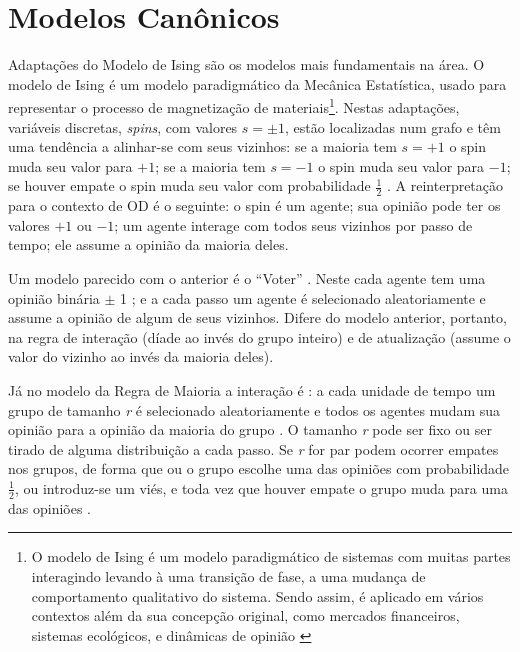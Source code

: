  

  \section{Modelos Canônicos}

  Adaptações do Modelo de Ising são os modelos mais fundamentais na área. O
  modelo de Ising é um modelo paradigmático da Mecânica Estatística, usado para
  representar o processo de magnetização de materiais\footnote{O modelo de Ising
    é um modelo paradigmático de sistemas com muitas partes interagindo levando
    à uma transição de fase, a uma mudança de comportamento qualitativo do
    sistema. Sendo assim, é aplicado em vários contextos além da sua concepção
    original, como mercados financeiros, sistemas ecológicos, e dinâmicas de
    opinião \cite{sole2011phase}}. Nestas adaptações, variáveis discretas,
  \textit{spins}, com valores $s = \pm 1$, estão localizadas num grafo e têm uma
  tendência a alinhar-se com seus vizinhos: se a maioria tem \(s = + 1 \) o spin
  muda seu valor para \(+1\); se a maioria tem \(s = -1 \) o spin muda seu valor
  para \(-1\); se houver empate o spin muda seu valor com probabilidade
  \(\frac{1}{2}\) \cite{castellano2012social,sole2011phase}. A reinterpretação
  para o contexto de OD é o seguinte: o spin é um agente; sua opinião pode ter
  os valores \(+1\) ou \(-1\); um agente interage com todos seus vizinhos por
  passo de tempo; ele assume a opinião da maioria deles.

  Um modelo parecido com o anterior é o ``Voter'' \cite{holley1975ergodic}. Neste
  cada agente tem uma opinião binária \(\pm\) 1 ; e a cada passo um agente é
  selecionado aleatoriamente e assume a opinião de algum de seus vizinhos.
  Difere do modelo anterior, portanto, na regra de interação (díade ao invés do
  grupo inteiro) e de atualização (assume o valor do vizinho ao invés da maioria
  deles).


  Já no modelo da Regra de Maioria a interação é : a cada
  unidade de tempo um grupo
  de tamanho \textit{r} é selecionado aleatoriamente e todos os agentes mudam
  sua opinião para a opinião da maioria do grupo
  \cite{galam1990social,galam2012sociophysics}. O tamanho \textit{r} pode ser
  fixo ou ser tirado de alguma distribuição a cada passo. Se \textit{r} for par
  podem ocorrer empates nos grupos, de forma que ou o grupo escolhe uma das
  opiniões com probabilidade \(\frac{1}{2}\), ou introduz-se um viés, e toda vez
  que houver empate o grupo muda para uma das opiniões
  \cite{galam2012sociophysics, galam1986majority}.

